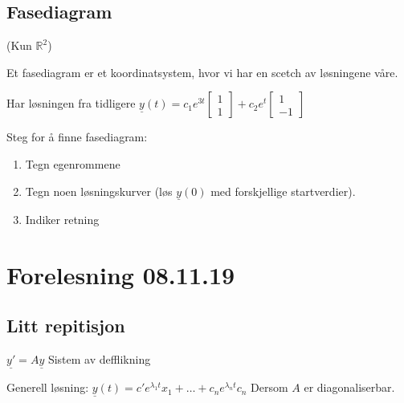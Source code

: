 \documentclass[11pt, a4paper, norsk]{article}
\begin{document}
            \subsection{Fasediagram}%
            \label{sub:fasediagram}
            
            (Kun $\mathbb{R}^2$)


            Et fasediagram er et koordinatsystem, hvor vi har en scetch av løsningene våre. 

            Har løsningen fra tidligere $\underline{y}(t) = c_1e^{3t}\begin{bmatrix}
                1 \\
                1
            \end{bmatrix} + c_2e^{t}\begin{bmatrix}
                1 \\
                -1
            \end{bmatrix}$

            Steg for å finne fasediagram:
            \begin{enumerate}
                \item Tegn egenrommene
                \item Tegn noen løsningskurver (løs $\underline{y}(0)$ med forskjellige startverdier).
                \item Indiker retning
            \end{enumerate}


            \section{Forelesning 08.11.19}
            \subsection{Litt repitisjon}%
            \label{sub:litt_repitisjon}
            
            $\underline{y'} = A\underline{y}$ Sistem av defflikning

            Generell løsning: $\underline{y}(t) = c'e^{\lambda_1t}x_1 + \dots + c_{n}e^{\lambda_{n}t}c_{n}$ Dersom $A$ er diagonaliserbar. 
\end{document}
